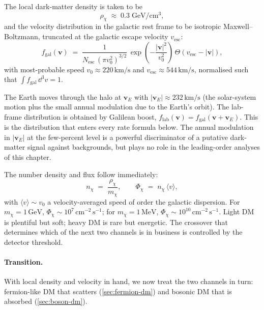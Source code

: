 \begin{statement}
\label{stmt:halo}
The local dark-matter density is taken to be
\begin{equation}
\label{eq:rho-chi}
\rho_\chi \;\approx\; 0.3\;\text{GeV}/\text{cm}^3,
\end{equation}
and the velocity distribution in the galactic rest frame to be
isotropic Maxwell--Boltzmann, truncated at the galactic escape
velocity $v_\text{esc}$:
\begin{equation}
\label{eq:halo-distribution}
f_\text{gal}(\bm v) \;=\; \frac{1}{N_\text{esc}\,(\pi v_0^2)^{3/2}}\,
\exp\!\left(-\frac{|\bm v|^2}{v_0^2}\right)\,\Theta\!\left(v_\text{esc}-|\bm v|\right),
\end{equation}
with most-probable speed $v_0\approx 220\,\text{km}/\text{s}$ and
$v_\text{esc}\approx 544\,\text{km}/\text{s}$, normalised such that
$\int f_\text{gal}\,\dd^3v=1$.
\end{statement}

\begin{remark}
The Earth moves through the halo at
$\bm v_E$ with $|\bm v_E|\approx 232\,\text{km}/\text{s}$ (the
solar-system motion plus the small annual modulation due to the
Earth's orbit). The lab-frame distribution is obtained by Galilean
boost,
$f_\text{lab}(\bm v)=f_\text{gal}(\bm v+\bm v_E)$. This is the
distribution that enters every rate formula below. The annual
modulation in $|\bm v_E|$ at the few-percent level is a powerful
discriminator of a putative dark-matter signal against
backgrounds, but plays no role in the leading-order analyses of
this chapter.
\end{remark}

The number density and flux follow immediately:
\begin{equation}
\label{eq:flux}
n_\chi \;=\; \frac{\rho_\chi}{m_\chi},
\qquad
\Phi_\chi \;=\; n_\chi\,\langle v\rangle,
\end{equation}
with $\langle v\rangle\sim v_0$ a velocity-averaged speed of order
the galactic dispersion. For $m_\chi=1\,\text{GeV}$, $\Phi_\chi\sim
10^7\,\text{cm}^{-2}\,\text{s}^{-1}$; for $m_\chi=1\,\text{MeV}$,
$\Phi_\chi\sim 10^{10}\,\text{cm}^{-2}\,\text{s}^{-1}$. Light DM is
plentiful but soft; heavy DM is rare but energetic. The crossover
that determines which of the next two channels is in business is
controlled by the detector threshold.

\paragraph{Transition.}
With local density and velocity in hand, we now treat the two
channels in turn: fermion-like DM that scatters
(\cref{sec:fermion-dm}) and bosonic DM that is absorbed
(\cref{sec:boson-dm}).

